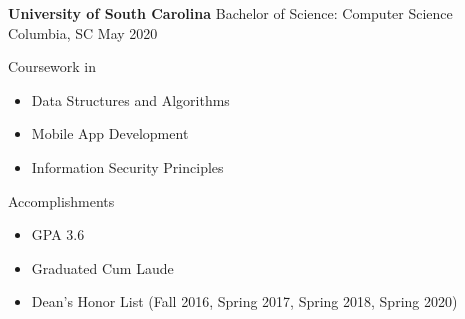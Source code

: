 
\begin{cventries}
  \cventry
    {\textbf {University of South Carolina}} %
    {Bachelor of Science: Computer Science} %
    {Columbia, SC} %
    {May 2020} %
    {
      \begin{cvitems} %
         \item {Coursework in }
         \begin{itemize}
                \item {Data Structures and Algorithms}
                \item {Mobile App Development}
                \item {Information Security Principles}
            \end{itemize}
         \vspace{0.5mm}
        \item {Accomplishments}
            \begin{itemize}
                \item {GPA 3.6}
                \item {Graduated Cum Laude}
                \item {Dean's Honor List (Fall 2016, Spring 2017, Spring 2018, Spring 2020)}
            \end{itemize}
      \end{cvitems}
    }
\end{cventries}
